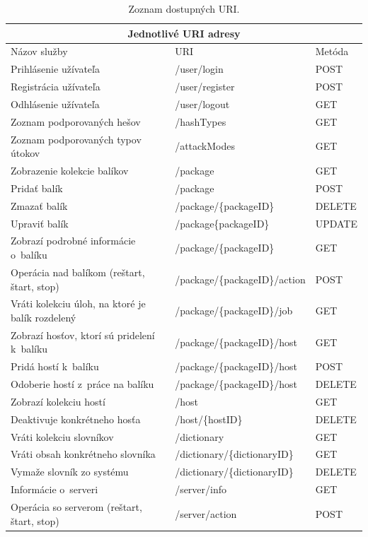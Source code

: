 \documentclass[slovak,cprint]{fitthesis} %
\begin{document}
\begin{table}[h]
  \begin{center}
        \begin{tabular}{ |p{7.7cm}|p{4.9cm}|p{1.5cm}|  }
         \hline
         \multicolumn{3}{|c|}{Jednotlivé URI adresy} \\
         \hline
         Názov služby& URI& Metóda\\
         \hline
         Prihlásenie užívateľa& /user/login & POST\\
         Registrácia užívateľa& /user/register& POST\\
         Odhlásenie užívateľa& /user/logout& GET\\
         Zoznam podporovaných hešov & /hashTypes & GET\\
         Zoznam podporovaných typov útokov & /attackModes & GET\\
         Zobrazenie kolekcie balíkov & /package & GET\\
         Pridať balík & /package & POST\\
         Zmazať balík & /package/\{packageID\} & DELETE\\
         Upraviť balík & /package\{packageID\} & UPDATE\\
         Zobrazí podrobné informácie o~balíku& /package/\{packageID\} & GET\\
         Operácia nad balíkom (reštart, štart, stop) & /package/\{packageID\}/action & POST\\
         Vráti kolekciu úloh, na ktoré je balík rozdelený& /package/\{packageID\}/job & GET\\
         Zobrazí hosťov, ktorí sú pridelení k~balíku & /package/\{packageID\}/host & GET\\
         Pridá hostí k~balíku & /package/\{packageID\}/host & POST\\
         Odoberie hostí z~práce na balíku & /package/\{packageID\}/host & DELETE\\
         Zobrazí kolekciu hostí& /host & GET\\
         Deaktivuje konkrétneho hosťa& /host/\{hostID\} & DELETE\\
         Vráti kolekciu slovníkov& /dictionary & GET\\
         Vráti obsah konkrétneho slovníka& /dictionary/\{dictionaryID\} & GET\\
         Vymaže slovník zo systému& /dictionary/\{dictionaryID\} & DELETE\\
         Informácie o~serveri& /server/info& GET\\
         Operácia so serverom (reštart, štart, stop) & /server/action & POST\\
         \hline
        \end{tabular}
      \caption{Zoznam dostupných URI.}
      \label{zoznamURItable}
  \end{center}
\end{table}
\end{document}
